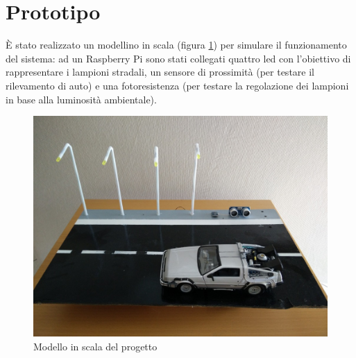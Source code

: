 \section{Prototipo}
È stato realizzato un modellino in scala (figura \ref{model}) per simulare il funzionamento del sistema: ad un Raspberry Pi sono stati collegati quattro led con l'obiettivo di rappresentare i lampioni stradali, un sensore di prossimità (per testare il rilevamento di auto) e una fotoresistenza (per testare la regolazione dei lampioni in base alla luminosità ambientale).
\begin{figure}[tbp]
	\centering
	\includegraphics[width=13cm]{figure/Model.jpg}
	\caption{Modello in scala del progetto \label{model}}
\end{figure}
